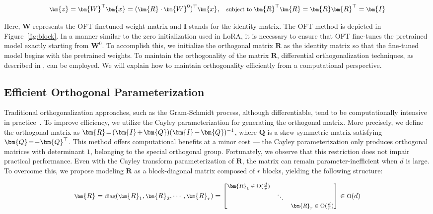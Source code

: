 \begin{equation}\label{eq:oft_general}
    \footnotesize
    \bm{z}=\bm{W}^\top\bm{x}=(\bm{R}\cdot\bm{W}^0)^\top\bm{x},~~~\text{subject to}~\bm{R}^\top\bm{R}=\bm{R}\bm{R}^\top=\bm{I}
\end{equation}

Here, $\bm{W}$ represents the OFT-finetuned weight matrix and $\bm{I}$ stands for the identity matrix. The OFT method is depicted in Figure~\ref{fig:block}. In a manner similar to the zero initialization used in LoRA, it is necessary to ensure that OFT fine-tunes the pretrained model exactly starting from $\bm{W}^0$. To accomplish this, we initialize the orthogonal matrix $\bm{R}$ as the identity matrix so that the fine-tuned model begins with the pretrained weights. To maintain the orthogonality of the matrix $\bm{R}$, differential orthogonalization techniques, as described in \cite{liu2021orthogonal,lezcano2019cheap}, can be employed. We will explain how to maintain orthogonality efficiently from a computational perspective.

\subsection{Efficient Orthogonal Parameterization}\label{sect:eff_ortho}

Traditional orthogonalization approaches, such as the Gram-Schmidt process, although differentiable, tend to be computationally intensive in practice~\cite{liu2021orthogonal}. To improve efficiency, we utilize the Cayley parameterization for generating the orthogonal matrix. More precisely, we define the orthogonal matrix as $\thickmuskip=2mu \medmuskip=2mu \bm{R}=(\bm{I}+\bm{Q})(\bm{I}-\bm{Q})^{-1}$, where $\bm{Q}$ is a skew-symmetric matrix satisfying $\thickmuskip=2mu \medmuskip=2mu \bm{Q}=-\bm{Q}^\top$. This method offers computational benefits at a minor cost — the Cayley parameterization only produces orthogonal matrices with determinant $1$, belonging to the special orthogonal group. Fortunately, we observe that this restriction does not impair practical performance. Even with the Cayley transform parameterization of $\bm{R}$, the matrix can remain parameter-inefficient when $d$ is large. To overcome this, we propose modeling $\bm{R}$ as a block-diagonal matrix composed of $r$ blocks, yielding the following structure:

\begin{equation}
    \footnotesize
    \bm{R}=\text{diag}(\bm{R}_1,\bm{R}_2,\cdots,\bm{R}_r)=\begin{bmatrix}
    \bm{R}_1\in \text{O}(\frac{d}{r}) &  &\\
    &\ddots & \\
    & & \bm{R}_r\in \text{O}(\frac{d}{r})
    \end{bmatrix}\in \text{O}(d)
\end{equation}

